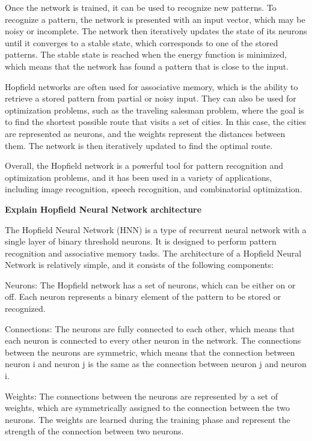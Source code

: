 \documentclass[11pt]{article}
\begin{document}
Once the network is trained, it can be used to recognize new patterns. To recognize a pattern, the network is presented with an input vector, which may be noisy or incomplete. The network then iteratively updates the state of its neurons until it converges to a stable state, which corresponds to one of the stored patterns. The stable state is reached when the energy function is minimized, which means that the network has found a pattern that is close to the input.

Hopfield networks are often used for associative memory, which is the ability to retrieve a stored pattern from partial or noisy input. They can also be used for optimization problems, such as the traveling salesman problem, where the goal is to find the shortest possible route that visits a set of cities. In this case, the cities are represented as neurons, and the weights represent the distances between them. The network is then iteratively updated to find the optimal route.

Overall, the Hopfield network is a powerful tool for pattern recognition and optimization problems, and it has been used in a variety of applications, including image recognition, speech recognition, and combinatorial optimization.


\textbf{Explain Hopfield Neural Network architecture}

The Hopfield Neural Network (HNN) is a type of recurrent neural network with a single layer of binary threshold neurons. It is designed to perform pattern recognition and associative memory tasks. The architecture of a Hopfield Neural Network is relatively simple, and it consists of the following components:

Neurons: The Hopfield network has a set of neurons, which can be either on or off. Each neuron represents a binary element of the pattern to be stored or recognized.

Connections: The neurons are fully connected to each other, which means that each neuron is connected to every other neuron in the network. The connections between the neurons are symmetric, which means that the connection between neuron i and neuron j is the same as the connection between neuron j and neuron i.

Weights: The connections between the neurons are represented by a set of weights, which are symmetrically assigned to the connection between the two neurons. The weights are learned during the training phase and represent the strength of the connection between two neurons.
\end{document}
